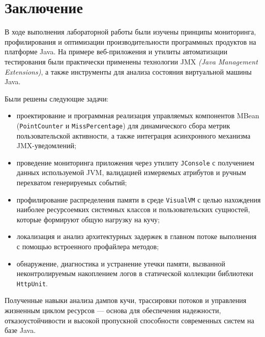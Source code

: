 \section{Заключение}

В ходе выполнения лабораторной работы были изучены принципы мониторинга, профилирования и оптимизации производительности программных продуктов на платформе Java. На примере веб-приложения и утилиты автоматизации тестирования были практически применены технологии JMX \textit{(Java Management Extensions)}, а также инструменты для анализа состояния виртуальной машины Java.

Были решены следующие задачи:
\begin{itemize}
  \item проектирование и программная реализация управляемых компонентов MBean (\texttt{PointCounter} и \texttt{MissPercentage}) для динамического сбора метрик пользовательской активности, а также интеграция асинхронного механизма JMX-уведомлений;
  \item проведение мониторинга приложения через утилиту \texttt{JConsole} с получением данных используемой JVM, валидацией измеряемых атрибутов и ручным перехватом генерируемых событий;
  \item профилирование распределения памяти в среде \texttt{VisualVM} с целью нахождения наиболее ресурсоемких системных классов и пользовательских сущностей, которые формируют общую нагрузку на кучу;
  \item локализация и анализ архитектурных задержек в главном потоке выполнения с помощью встроенного профайлера методов;
  \item обнаружение, диагностика и устранение утечки памяти, вызванной неконтролируемым накоплением логов в статической коллекции библиотеки \texttt{HttpUnit}.
\end{itemize}

Полученные навыки анализа дампов кучи, трассировки потоков и управления жизненным циклом ресурсов --- основа для обеспечения надежности, отказоустойчивости и высокой пропускной способности современных систем на базе Java.